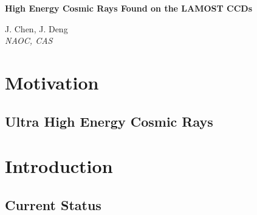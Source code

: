 \documentclass[12pt,twoside,letterpaper]{article}
\begin{document}
\begin{center}
  \begin{Large}
  {\bf High Energy Cosmic Rays Found on the LAMOST CCDs}
  \end{Large}
\end{center}

\begin{center}
\small{J. Chen, J. Deng}\vspace{1.0ex} \\
\emph{NAOC, CAS}
\end{center}


\begin{abstract}

\end{abstract}

\section{Motivation} 

\subsection{Ultra High Energy Cosmic Rays} 

\section{Introduction} 

\subsection{Current Status} 
\end{document}
